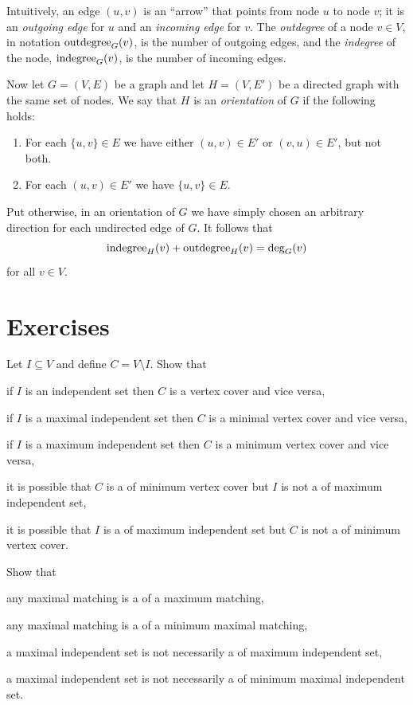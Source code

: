 Intuitively, an edge $(u,v)$ is an ``arrow'' that points from node $u$ to node $v$; it is an \emph{outgoing edge} for $u$ and an \emph{incoming edge} for $v$. The \emph{outdegree} of a node $v \in V$, in notation $\operatorname{outdegree}_G(v)$, is the number of outgoing edges, and the \emph{indegree} of the node, $\operatorname{indegree}_G(v)$, is the number of incoming edges.

Now let $G = (V,E)$ be a graph and let $H = (V,E')$ be a directed graph with the same set of nodes. We say that $H$ is an \emph{orientation} of $G$ if the following holds:
\begin{enumerate}
    \item For each $\{u,v\} \in E$ we have either $(u,v) \in E'$ or $(v,u) \in E'$, but not both.
    \item For each $(u,v) \in E'$ we have $\{u,v\} \in E$.
\end{enumerate}
Put otherwise, in an orientation of $G$ we have simply chosen an arbitrary direction for each undirected edge of $G$. It follows that \[\operatorname{indegree}_H(v) + \operatorname{outdegree}_H(v) = \deg_G(v)\] for all $v \in V$.


\section{Exercises}

\begin{ex}
    Let $I \subseteq V$ and define $C = V \setminus I$. Show that
    \begin{subex}
        \item if $I$ is an independent set then $C$ is a vertex cover and vice versa,
        \item if $I$ is a maximal independent set then $C$ is a minimal vertex cover and vice versa,
        \item if $I$ is a maximum independent set then $C$ is a minimum vertex cover and vice versa,
        \item it is possible that $C$ is a  of minimum vertex cover but $I$ is not a  of maximum independent set,
        \item it is possible that $I$ is a  of maximum independent set but $C$ is not a  of minimum vertex cover.
    \end{subex}
\end{ex}

\begin{ex}[matchings]
    Show that
    \begin{subex}
        \item any maximal matching is a  of a maximum matching,
        \item any maximal matching is a  of a minimum maximal matching,
        \item a maximal independent set is not necessarily a  of maximum independent set,
        \item a maximal independent set is not necessarily a  of minimum maximal independent set.
    \end{subex}
\end{ex}

